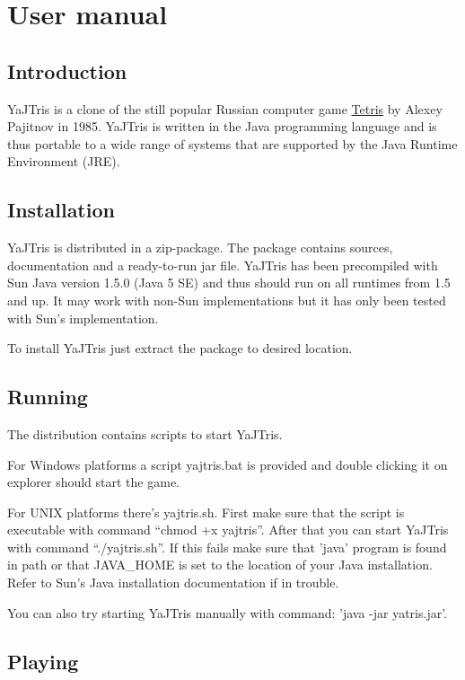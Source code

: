 \section {User manual}

\subsection {Introduction}

YaJTris is a clone of the still popular Russian computer game \href{http://en.wikipedia.org/wiki/Tetris}{Tetris} by Alexey Pajitnov in 1985.
YaJTris is written in the Java programming language and is thus portable to a wide range of systems that are supported
by the Java Runtime Environment (JRE).

\subsection {Installation}

YaJTris is distributed in a zip-package. The package contains sources, documentation and a
ready-to-run jar file. YaJTris has been precompiled with Sun Java version 1.5.0 (Java 5 SE) and thus
should run on all runtimes from 1.5 and up. It may work with non-Sun implementations but it has only been tested
with Sun's implementation.

To install YaJTris just extract the package to desired location.

\subsection {Running}

The distribution contains scripts to start YaJTris.

For Windows platforms a script yajtris.bat
is provided and double clicking it on explorer should start the game.

For UNIX platforms there's yajtris.sh. First make sure that the script is executable with command
``chmod +x yajtris''. After that you can start YaJTris with command ``./yajtris.sh''. If this fails
make sure that 'java' program is found in path or that JAVA\_HOME is set to the location of
your Java installation. Refer to Sun's Java installation documentation if in trouble.

You can also try starting YaJTris manually with command: 'java -jar yatris.jar'.

\subsection {Playing}

